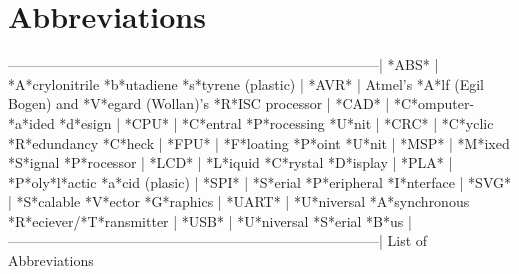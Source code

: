 \documentclass[a4paper, 11pt, oneside]{Thesis}  %
\begin{document}
\section{Abbreviations}

--------------------------------------------------------------------------------|
*ABS*	| *A*crylonitrile *b*utadiene *s*tyrene (plastic)			|
*AVR*	| Atmel's *A*lf (Egil Bogen) and *V*egard (Wollan)'s *R*ISC processor	|
*CAD*	| *C*omputer-*a*ided *d*esign						|
*CPU*	| *C*entral *P*rocessing *U*nit						|
*CRC*	| *C*yclic *R*edundancy *C*heck						|
*FPU*	| *F*loating *P*oint *U*nit						|
*MSP*	| *M*ixed *S*ignal *P*rocessor						|
*LCD*	| *L*iquid *C*rystal *D*isplay						|
*PLA*	| *P*oly*l*actic *a*cid (plasic)					|
*SPI*	| *S*erial *P*eripheral *I*nterface					|
*SVG*	| *S*calable *V*ector *G*raphics					|
*UART*	| *U*niversal *A*synchronous *R*eciever/*T*ransmitter			|
*USB*	| *U*niversal *S*erial *B*us						|
--------------------------------------------------------------------------------|
	List of Abbreviations
\end{document}
